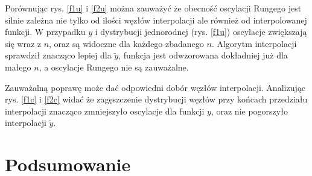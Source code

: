 \documentclass[11pt]{extarticle}
\begin{document}
	Porównując rys. \ref{f1u} i \ref{f2u} można zauważyć że obecność oscylacji Rungego jest silnie zależna nie tylko od ilości węzłów interpolacji ale również od interpolowanej funkcji.
	W przypadku \(y\) i dystrybucji jednorodnej (rys. \ref{f1u}) oscylacje zwiększają się wraz z \(n\), oraz są widoczne dla każdego zbadanego \(n\).
	Algorytm interpolacji sprawdził znacząco lepiej dla \(\widetilde{y}\), funkcja jest odwzorowana dokładniej już dla małego \(n\), a oscylacje Rungego nie są zauważalne.

	Zauważalną poprawę może dać odpowiedni dobór węzłów interpolacji. Analizując rys. \ref{f1c} i \ref{f2c} widać że zagęszczenie dystrybucji węzłów przy końcach przedziału interpolacji znacząco zmniejszyło oscylacje dla funkcji \(y\), oraz nie pogorszyło interpolacji \(\widetilde{y}\).

	\section{Podsumowanie}
	
\end{document}
